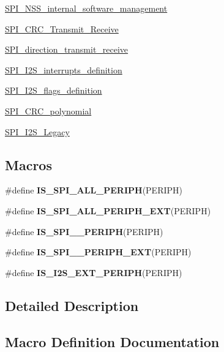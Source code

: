 \begin{DoxyCompactItemize}
\item 
\hyperlink{group___s_p_i___n_s_s__internal__software__management}{S\+P\+I\+\_\+\+N\+S\+S\+\_\+internal\+\_\+software\+\_\+management}
\item 
\hyperlink{group___s_p_i___c_r_c___transmit___receive}{S\+P\+I\+\_\+\+C\+R\+C\+\_\+\+Transmit\+\_\+\+Receive}
\item 
\hyperlink{group___s_p_i__direction__transmit__receive}{S\+P\+I\+\_\+direction\+\_\+transmit\+\_\+receive}
\item 
\hyperlink{group___s_p_i___i2_s__interrupts__definition}{S\+P\+I\+\_\+\+I2\+S\+\_\+interrupts\+\_\+definition}
\item 
\hyperlink{group___s_p_i___i2_s__flags__definition}{S\+P\+I\+\_\+\+I2\+S\+\_\+flags\+\_\+definition}
\item 
\hyperlink{group___s_p_i___c_r_c__polynomial}{S\+P\+I\+\_\+\+C\+R\+C\+\_\+polynomial}
\item 
\hyperlink{group___s_p_i___i2_s___legacy}{S\+P\+I\+\_\+\+I2\+S\+\_\+\+Legacy}
\end{DoxyCompactItemize}
\subsection*{Macros}
\begin{DoxyCompactItemize}
\item 
\#define {\bfseries I\+S\+\_\+\+S\+P\+I\+\_\+\+A\+L\+L\+\_\+\+P\+E\+R\+I\+P\+H}(P\+E\+R\+I\+P\+H)
\item 
\#define {\bfseries I\+S\+\_\+\+S\+P\+I\+\_\+\+A\+L\+L\+\_\+\+P\+E\+R\+I\+P\+H\+\_\+\+E\+X\+T}(P\+E\+R\+I\+P\+H)
\item 
\#define {\bfseries I\+S\+\_\+\+S\+P\+I\+\_\+\_\+\+P\+E\+R\+I\+P\+H}(P\+E\+R\+I\+P\+H)
\item 
\#define {\bfseries I\+S\+\_\+\+S\+P\+I\+\_\+\_\+\+P\+E\+R\+I\+P\+H\+\_\+\+E\+X\+T}(P\+E\+R\+I\+P\+H)
\item 
\#define {\bfseries I\+S\+\_\+\+I2\+S\+\_\+\+E\+X\+T\+\_\+\+P\+E\+R\+I\+P\+H}(P\+E\+R\+I\+P\+H)
\end{DoxyCompactItemize}


\subsection{Detailed Description}


\subsection{Macro Definition Documentation}
\hypertarget{group___s_p_i___exported___constants_gaed21835cf2bf6c9469dedaa8720627c2}{}

